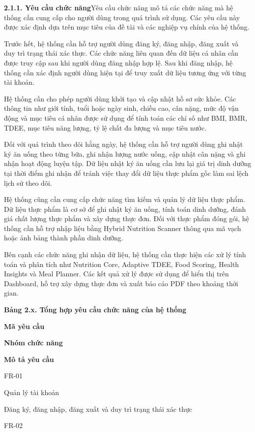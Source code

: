 \textbf{2.1.1. Yêu cầu chức năng}Yêu cầu chức năng mô tả các chức năng mà hệ thống cần cung cấp cho người dùng trong quá trình sử dụng. Các yêu cầu này được xác định dựa trên mục tiêu của đề tài và các nghiệp vụ chính của hệ thống.

Trước hết, hệ thống cần hỗ trợ người dùng đăng ký, đăng nhập, đăng xuất và duy trì trạng thái xác thực. Các chức năng liên quan đến dữ liệu cá nhân cần được truy cập sau khi người dùng đăng nhập hợp lệ. Sau khi đăng nhập, hệ thống cần xác định người dùng hiện tại để truy xuất dữ liệu tương ứng với từng tài khoản.

Hệ thống cần cho phép người dùng khởi tạo và cập nhật hồ sơ sức khỏe. Các thông tin như giới tính, tuổi hoặc ngày sinh, chiều cao, cân nặng, mức độ vận động và mục tiêu cá nhân được sử dụng để tính toán các chỉ số như BMI, BMR, TDEE, mục tiêu năng lượng, tỷ lệ chất đa lượng và mục tiêu nước.

Đối với quá trình theo dõi hằng ngày, hệ thống cần hỗ trợ người dùng ghi nhật ký ăn uống theo từng bữa, ghi nhận lượng nước uống, cập nhật cân nặng và ghi nhận hoạt động luyện tập. Dữ liệu nhật ký ăn uống cần lưu lại giá trị dinh dưỡng tại thời điểm ghi nhận để tránh việc thay đổi dữ liệu thực phẩm gốc làm sai lệch lịch sử theo dõi.

Hệ thống cũng cần cung cấp chức năng tìm kiếm và quản lý dữ liệu thực phẩm. Dữ liệu thực phẩm là cơ sở để ghi nhật ký ăn uống, tính toán dinh dưỡng, đánh giá chất lượng thực phẩm và xây dựng thực đơn. Đối với thực phẩm đóng gói, hệ thống cần hỗ trợ nhập liệu bằng Hybrid Nutrition Scanner thông qua mã vạch hoặc ảnh bảng thành phần dinh dưỡng.

Bên cạnh các chức năng ghi nhận dữ liệu, hệ thống cần thực hiện các xử lý tính toán và phân tích như Nutrition Core, Adaptive TDEE, Food Scoring, Health Insights và Meal Planner. Các kết quả xử lý được sử dụng để hiển thị trên Dashboard, hỗ trợ xây dựng thực đơn và xuất báo cáo PDF theo khoảng thời gian.

\textbf{Bảng 2.x. Tổng hợp yêu cầu chức năng của hệ thống}

\textbf{Mã yêu cầu}

\textbf{Nhóm chức năng}

\textbf{Mô tả yêu cầu}

FR-01

Quản lý tài khoản

Đăng ký, đăng nhập, đăng xuất và duy trì trạng thái xác thực

FR-02

